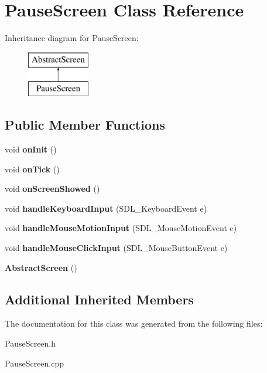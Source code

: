 \hypertarget{class_pause_screen}{}\section{Pause\+Screen Class Reference}
\label{class_pause_screen}
Inheritance diagram for Pause\+Screen\+:\begin{figure}[H]
\begin{center}
\leavevmode
\includegraphics[height=2.000000cm]{class_pause_screen}
\end{center}
\end{figure}
\subsection*{Public Member Functions}
\begin{DoxyCompactItemize}
\item 
\mbox{\label{class_pause_screen_ae8196adf49b2e7439677a5360a8d43d4}} 
void {\bfseries on\+Init} ()
\item 
\mbox{\label{class_pause_screen_a89ef5189bdc9acfae5eedbff2cf4b458}} 
void {\bfseries on\+Tick} ()
\item 
\mbox{\label{class_pause_screen_a2eb2b032a3c3e833beb505c2df12396b}} 
void {\bfseries on\+Screen\+Showed} ()
\item 
\mbox{\label{class_pause_screen_a94112a789c88bdf68809b09ec86049c8}} 
void {\bfseries handle\+Keyboard\+Input} (S\+D\+L\+\_\+\+Keyboard\+Event e)
\item 
\mbox{\label{class_pause_screen_a19ce9a528ab648afb81a2251810afcfa}} 
void {\bfseries handle\+Mouse\+Motion\+Input} (S\+D\+L\+\_\+\+Mouse\+Motion\+Event e)
\item 
\mbox{\label{class_pause_screen_a82ce01aa34df937a0f072d6210ac4386}} 
void {\bfseries handle\+Mouse\+Click\+Input} (S\+D\+L\+\_\+\+Mouse\+Button\+Event e)
\item 
\mbox{\label{class_pause_screen_a9c46f578b910897d268ce46b5057bf50}} 
{\bfseries Abstract\+Screen} ()
\end{DoxyCompactItemize}
\subsection*{Additional Inherited Members}


The documentation for this class was generated from the following files\+:\begin{DoxyCompactItemize}
\item 
Pause\+Screen.\+h\item 
Pause\+Screen.\+cpp\end{DoxyCompactItemize}
